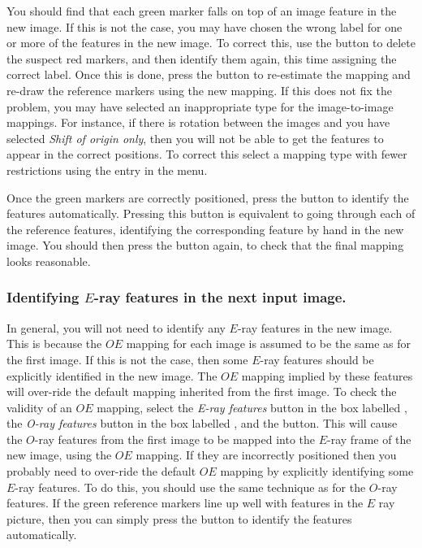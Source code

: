 You should find that each green marker falls on top of an image feature
in the new image. If this is not the case, you may have chosen the wrong
label for one or more of the features in the new image. To correct this,
use the  button to delete the suspect
red markers, and then identify them again, this time assigning the
correct label. Once this is done, press the  button to re-estimate the mapping and re-draw the
reference markers using the new mapping. If this does not fix the
problem, you may have selected an inappropriate type for the
image-to-image mappings. For instance, if there is rotation between the
images and you have selected {\em Shift of origin only}, then you will
not be able to get the features to appear in the correct positions. To
correct this select a mapping type with fewer restrictions using the
 entry in the  menu.

Once the green markers are correctly positioned, press the
 button to identify the features
automatically. Pressing this button is equivalent to going
through each of the reference features, identifying the corresponding
feature by hand in the new image. You should then press the  button again, to check that the final mapping
looks reasonable.

\subsubsection {Identifying $E$-ray features in the next input image.}
In general, you will not need to identify any $E$-ray features in the new
image. This is because the $OE$ mapping for each image is assumed to be
the same as for the first image. If this is not the case, then some
$E$-ray features should be explicitly identified in the new image. The
$OE$ mapping implied by these features will over-ride the default mapping
inherited from the first image. To check the validity of an $OE$
mapping, select the {\em E-ray features} button in the box labelled
, the {\em O-ray features} button in
the box labelled , and the 
 button. This will cause
the $O$-ray features from the first image to be mapped into the $E$-ray
frame of the new image, using the $OE$ mapping. If they are incorrectly
positioned then you probably need to over-ride the default $OE$ mapping
by explicitly identifying some $E$-ray features. To do this, you should
use the same technique as for the $O$-ray features. If the green
reference markers line up well with features in the $E$ ray picture, then
you can simply press the  button to
identify the features automatically.

